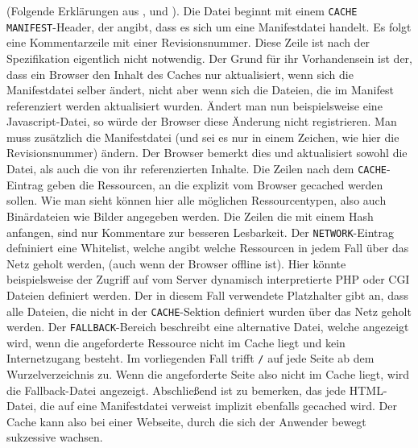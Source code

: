 (Folgende Erklärungen aus \cite{w3c_offline_appcache}, \cite{html5_up_and_running_chapter_8} und \cite{html5_rocks_appcache_leitfaden}). Die Datei beginnt mit einem \texttt{CACHE MANIFEST}-Header, der angibt, dass es sich um eine Manifestdatei handelt. Es folgt eine Kommentarzeile mit einer Revisionsnummer. Diese Zeile ist nach der Spezifikation eigentlich nicht notwendig. Der Grund für ihr Vorhandensein ist der, dass ein Browser den Inhalt des Caches nur aktualisiert, wenn sich die Manifestdatei selber ändert, nicht aber wenn sich die Dateien, die im Manifest referenziert werden aktualisiert wurden. Ändert man nun beispielsweise eine Javascript-Datei, so würde der Browser diese Änderung nicht registrieren. Man muss zusätzlich die Manifestdatei (und sei es nur in einem Zeichen, wie hier die Revisionsnummer) ändern. Der Browser bemerkt dies und aktualisiert sowohl die Datei, als auch die von ihr referenzierten Inhalte. Die Zeilen nach dem \texttt{CACHE}-Eintrag geben die Ressourcen, an die explizit vom Browser gecached werden sollen. Wie man sieht können hier alle möglichen Ressourcentypen, also auch Binärdateien wie Bilder angegeben werden. Die Zeilen die mit einem Hash anfangen, sind nur Kommentare zur besseren Lesbarkeit. Der \texttt{NETWORK}-Eintrag defniniert eine Whitelist, welche angibt welche Ressourcen in jedem Fall über das Netz geholt werden, (auch wenn der Browser offline ist). Hier könnte beispielsweise der Zugriff auf vom Server dynamisch interpretierte PHP oder CGI Dateien definiert werden. Der in diesem Fall verwendete Platzhalter gibt an, dass alle Dateien, die nicht in der \texttt{CACHE}-Sektion definiert wurden über das Netz geholt werden. Der \texttt{FALLBACK}-Bereich beschreibt eine alternative Datei, welche angezeigt wird, wenn die angeforderte Ressource nicht im Cache liegt und kein Internetzugang besteht. Im vorliegenden Fall trifft \texttt{/} auf jede Seite ab dem Wurzelverzeichnis zu. Wenn die angeforderte Seite also nicht im Cache liegt, wird die Fallback-Datei angezeigt. Abschließend ist zu bemerken, das jede HTML-Datei, die auf eine Manifestdatei verweist implizit ebenfalls gecached wird. Der Cache kann also bei einer Webseite, durch die sich der Anwender bewegt sukzessive wachsen.   

